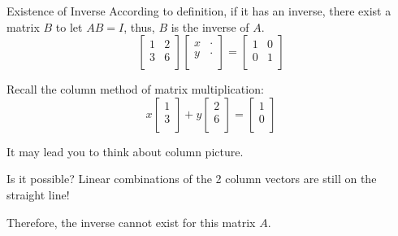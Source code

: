\documentclass{beamer}
\begin{document}
\begin{frame}{Existence of Inverse}
According to definition, if it has an inverse, there exist a matrix $B$ to let $AB=I$, thus, $B$ is the inverse of $A$.
\begin{equation*}
    \left[ \begin{matrix}
        1&		2\\
        3&		6\\
    \end{matrix} \right] \left[ \begin{matrix}
        x&		\cdot\\
        y&		\cdot\\
    \end{matrix} \right] =\left[ \begin{matrix}
        1&		0\\
        0&		1\\
    \end{matrix} \right]
\end{equation*}

Recall the column method of matrix multiplication:
\begin{equation*}
    x\left[ \begin{array}{c}
        1\\
        3\\
    \end{array} \right] +y\left[ \begin{array}{c}
        2\\
        6\\
    \end{array} \right] =\left[ \begin{array}{c}
        1\\
        0\\
    \end{array} \right]
\end{equation*}

It may lead you to think about column picture.

\vspace{3pt}
Is it possible? Linear combinations of the 2 column vectors are still on the straight line!

\vspace{3pt}
Therefore, the inverse cannot exist for this matrix $A$.
\end{frame}
\end{document}

